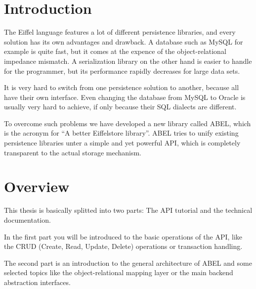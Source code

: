 \section{Introduction}

The Eiffel language features a lot of different persistence libraries, and every solution has its own advantages and drawback.
A database such as MySQL for example is quite fast, but it comes at the expence of the object-relational impedance mismatch.
A serialization library on the other hand is easier to handle for the programmer, but its performance rapidly decreases for large data sets.

It is very hard to switch from one persistence solution to another, because all have their own interface.
Even changing the database from MySQL to Oracle is usually very hard to achieve, if only because their SQL dialects are different.

To overcome such problems we have developed a new library called ABEL, which is the acronym for ``A better Eiffelstore library''.
ABEL tries to unify existing persistence libraries unter a simple and yet powerful API, which is completely transparent to the actual storage mechanism.


\section{Overview}
This thesis is basically splitted into two parts: The API tutorial and the technical documentation.

In the first part you will be introduced to the basic operations of the API, like the CRUD (Create, Read, Update, Delete) operations or transaction handling.

The second part is an introduction to the general architecture of ABEL and some selected topics like the object-relational mapping layer or the main backend abstraction interfaces.